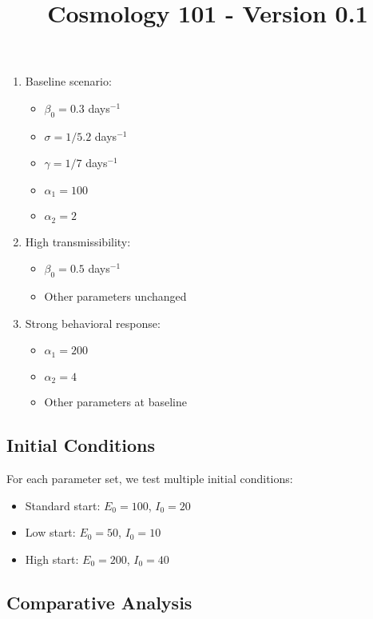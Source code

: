 \documentclass{article}\usepackage{graphicx} \usepackage{amsmath} \usepackage{colortbl}\title{Cosmology 101 - Version 0.1}
\begin{document}
\begin{enumerate}
    \item Baseline scenario:
        \begin{itemize}
            \item $\beta_0 = 0.3$ days$^{-1}$
            \item $\sigma = 1/5.2$ days$^{-1}$
            \item $\gamma = 1/7$ days$^{-1}$
            \item $\alpha_1 = 100$
            \item $\alpha_2 = 2$
        \end{itemize}
    
    \item High transmissibility:
        \begin{itemize}
            \item $\beta_0 = 0.5$ days$^{-1}$
            \item Other parameters unchanged
        \end{itemize}
    
    \item Strong behavioral response:
        \begin{itemize}
            \item $\alpha_1 = 200$
            \item $\alpha_2 = 4$
            \item Other parameters at baseline
        \end{itemize}
\end{enumerate}

\subsection{Initial Conditions}

For each parameter set, we test multiple initial conditions:

\begin{itemize}
    \item Standard start: $E_0 = 100$, $I_0 = 20$
    \item Low start: $E_0 = 50$, $I_0 = 10$
    \item High start: $E_0 = 200$, $I_0 = 40$
\end{itemize}

\subsection{Comparative Analysis}
\end{document}
